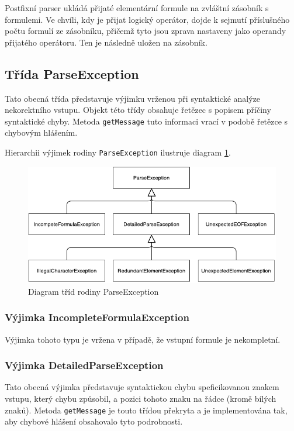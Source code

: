 \documentclass[thesis=B,czech,hidelinks]{thesis}[2012/06/26]
\begin{document}
Postfixní parser ukládá přijaté elementární formule na zvláštní zásobník s formulemi. Ve chvíli, kdy je přijat logický operátor, dojde k sejmutí příslušného počtu formulí ze zásobníku, přičemž tyto jsou zprava nastaveny jako operandy přijatého operátoru. Ten je následně uložen na zásobník.

\subsection{Třída ParseException}
\label{sec:parse_exception}

Tato obecná třída představuje výjimku vrženou při syntaktické analýze nekorektního vstupu. Objekt této třídy obsahuje řetězec s popisem příčiny syntaktické chyby. Metoda \texttt{getMessage} tuto informaci vrací v podobě řetězce s chybovým hlášením.

Hierarchii výjimek rodiny \texttt{ParseException} ilustruje diagram \ref{fig:parse_exception}.

\begin{figure}
\centering
\caption{Diagram tříd rodiny ParseException}
\label{fig:parse_exception}
\includegraphics[width=\linewidth]{diagrams/parse_exception}
\end{figure}

\subsubsection{Výjimka IncompleteFormulaException}

Výjimka tohoto typu je vržena v případě, že vstupní formule je nekompletní.

\subsubsection{Výjimka DetailedParseException}

Tato obecná výjimka představuje syntaktickou chybu speficikovanou znakem vstupu, který chybu způsobil, a pozici tohoto znaku na řádce (kromě bílých znaků). Metoda \texttt{getMessage} je touto třídou překryta a je implementována tak, aby chybové hlášení obsahovalo tyto podrobnosti.
\end{document}
